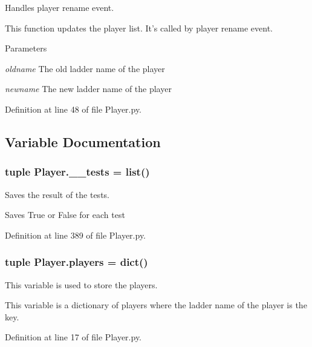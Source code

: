 Handles player rename event. 

This function updates the player list. It's called by player rename event. 
\begin{DoxyParams}{Parameters}
\item[{\em oldname}]The old ladder name of the player \item[{\em newname}]The new ladder name of the player \end{DoxyParams}


Definition at line 48 of file Player.py.



\subsection{Variable Documentation}
\hypertarget{namespace_player_a977b33b1d2c2e558d3d5160ee25ee788}{
\subsubsection[{\_\-\_\-tests}]{\setlength{\rightskip}{0pt plus 5cm}tuple {\bf Player.\_\-\_\-tests} = list()}}
\label{namespace_player_a977b33b1d2c2e558d3d5160ee25ee788}


Saves the result of the tests. 

Saves True or False for each test 

Definition at line 389 of file Player.py.

\hypertarget{namespace_player_a1a4b55c172677536d879fb397d3ef15e}{
\subsubsection[{players}]{\setlength{\rightskip}{0pt plus 5cm}tuple {\bf Player.players} = dict()}}
\label{namespace_player_a1a4b55c172677536d879fb397d3ef15e}


This variable is used to store the players. 

This variable is a dictionary of players where the ladder name of the player is the key. 

Definition at line 17 of file Player.py.

